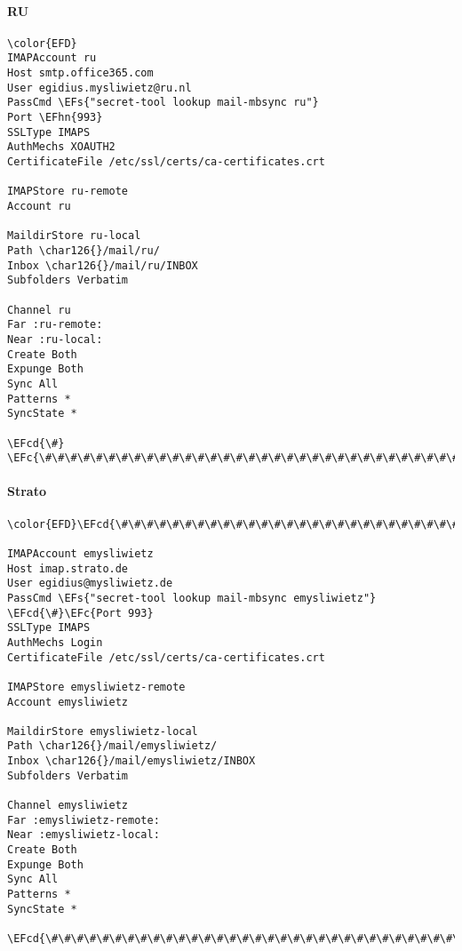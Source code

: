 \documentclass[a4wide,10pt]{article}
\newcommand{\EFc}[1]{\textcolor{EFc}{#1}} %
\newcommand{\EFcd}[1]{\textcolor{EFcd}{#1}} %
\newcommand{\EFs}[1]{\textcolor{EFs}{#1}} %
\newcommand{\EFhn}[1]{\textcolor{EFhn}{\textbf{#1}}} %
\begin{document}
\paragraph{RU}
\label{sec:org0a15bab}
\begin{Code}
\begin{Verbatim}
\color{EFD}
IMAPAccount ru
Host smtp.office365.com
User egidius.mysliwietz@ru.nl
PassCmd \EFs{"secret-tool lookup mail-mbsync ru"}
Port \EFhn{993}
SSLType IMAPS
AuthMechs XOAUTH2
CertificateFile /etc/ssl/certs/ca-certificates.crt

IMAPStore ru-remote
Account ru

MaildirStore ru-local
Path \char126{}/mail/ru/
Inbox \char126{}/mail/ru/INBOX
Subfolders Verbatim

Channel ru
Far :ru-remote:
Near :ru-local:
Create Both
Expunge Both
Sync All
Patterns *
SyncState *

\EFcd{\#} \EFc{\#\#\#\#\#\#\#\#\#\#\#\#\#\#\#\#\#\#\#\#\#\#\#\#\#\#\#\#\#\#\#\#\#\#\#\#\#\#\#\#\#\#\#}
\end{Verbatim}
\end{Code}
\paragraph{Strato}
\label{sec:org71fbea8}
\begin{Code}
\begin{Verbatim}
\color{EFD}\EFcd{\#\#\#\#\#\#\#\#\#\#\#\#\#\#\#\#\#\#\#\#\#\#\#\#\#\#\#\#\#\#\#\#\#\#\#\#\#\#\#\#\#\#\#}

IMAPAccount emysliwietz
Host imap.strato.de
User egidius@mysliwietz.de
PassCmd \EFs{"secret-tool lookup mail-mbsync emysliwietz"}
\EFcd{\#}\EFc{Port 993}
SSLType IMAPS
AuthMechs Login
CertificateFile /etc/ssl/certs/ca-certificates.crt

IMAPStore emysliwietz-remote
Account emysliwietz

MaildirStore emysliwietz-local
Path \char126{}/mail/emysliwietz/
Inbox \char126{}/mail/emysliwietz/INBOX
Subfolders Verbatim

Channel emysliwietz
Far :emysliwietz-remote:
Near :emysliwietz-local:
Create Both
Expunge Both
Sync All
Patterns *
SyncState *

\EFcd{\#\#\#\#\#\#\#\#\#\#\#\#\#\#\#\#\#\#\#\#\#\#\#\#\#\#\#\#\#\#\#\#\#\#\#\#\#\#\#\#\#\#\#}
\end{Verbatim}
\end{Code}
\end{document}
